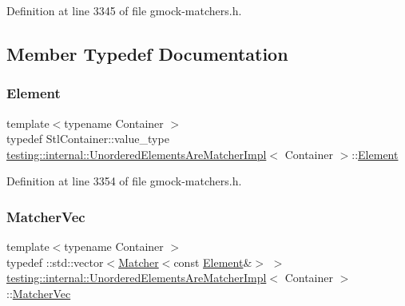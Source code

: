 Definition at line 3345 of file gmock-\/matchers.\+h.



\subsection{Member Typedef Documentation}
\mbox{\label{classtesting_1_1internal_1_1UnorderedElementsAreMatcherImpl_ad62ba6ff582afe086d522951f94e30d0}} 
\subsubsection{\texorpdfstring{Element}{Element}}
{\footnotesize\ttfamily template$<$typename Container $>$ \\
typedef Stl\+Container\+::value\+\_\+type \hyperlink{classtesting_1_1internal_1_1UnorderedElementsAreMatcherImpl}{testing\+::internal\+::\+Unordered\+Elements\+Are\+Matcher\+Impl}$<$ Container $>$\+::\hyperlink{classtesting_1_1internal_1_1UnorderedElementsAreMatcherImpl_ad62ba6ff582afe086d522951f94e30d0}{Element}}



Definition at line 3354 of file gmock-\/matchers.\+h.

\mbox{\label{classtesting_1_1internal_1_1UnorderedElementsAreMatcherImpl_afc098105ab7ac15cba95ca34644f0cef}} 
\subsubsection{\texorpdfstring{Matcher\+Vec}{MatcherVec}}
{\footnotesize\ttfamily template$<$typename Container $>$ \\
typedef \+::std\+::vector$<$\hyperlink{classtesting_1_1Matcher}{Matcher}$<$const \hyperlink{classtesting_1_1internal_1_1UnorderedElementsAreMatcherImpl_ad62ba6ff582afe086d522951f94e30d0}{Element}\&$>$ $>$ \hyperlink{classtesting_1_1internal_1_1UnorderedElementsAreMatcherImpl}{testing\+::internal\+::\+Unordered\+Elements\+Are\+Matcher\+Impl}$<$ Container $>$\+::\hyperlink{classtesting_1_1internal_1_1UnorderedElementsAreMatcherImpl_afc098105ab7ac15cba95ca34644f0cef}{Matcher\+Vec}\hspace{0.3cm}{\ttfamily [private]}}




